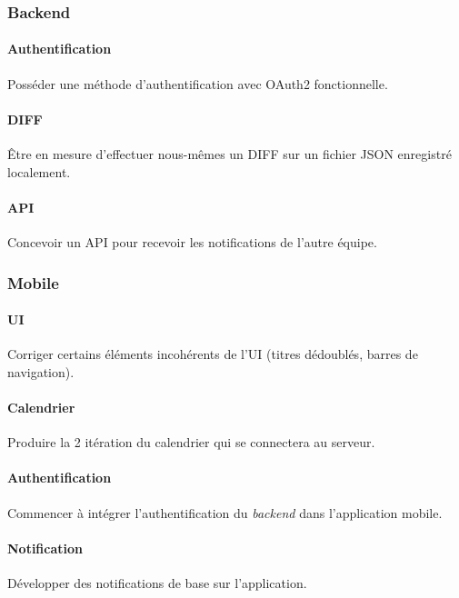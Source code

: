 \subsubsection{Backend}

\paragraph{Authentification} Posséder une méthode d'authentification avec OAuth2 fonctionnelle.

\paragraph{DIFF} Être en mesure d'effectuer nous-mêmes un DIFF sur un fichier JSON enregistré localement.

\paragraph{API} Concevoir un API pour recevoir les notifications de l'autre équipe.

\subsubsection{Mobile}

\paragraph{UI} Corriger certains éléments incohérents de l'UI (titres dédoublés, barres de navigation).

\paragraph{Calendrier} Produire la 2\ieme{} itération du calendrier qui se connectera au serveur.

\paragraph{Authentification} Commencer à intégrer l'authentification du \emph{backend} dans l'application mobile.

\paragraph{Notification} Développer des notifications de base sur l'application.

